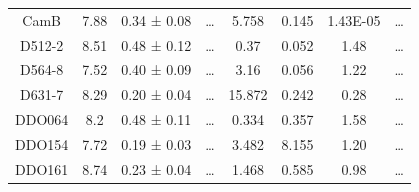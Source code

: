 \documentclass[reprint,%
 amsmath,amssymb,
 aps,
]{revtex4-1}
\begin{document}
\begin{longtable*}{|c|c|c|c|c|c|c|c| }
CamB                 & 7.88                      & 0.34 ± 0.08           & …                      & 5.758                                                        & 0.145                                                          & 1.43E-05                                                              & …                                                             \\
D512-2               & 8.51                      & 0.48 ± 0.12           & …                      & 0.37                                                         & 0.052                                                       & 1.48                                                           & …                                                             \\
D564-8               & 7.52                      & 0.40 ± 0.09           & …                      & 3.16                                                         & 0.056                                                          & 1.22                                                           & …                                                             \\
D631-7               & 8.29                      & 0.20 ± 0.04           & …                      & 15.872                                                       & 0.242                                                         & 0.28                                                           & …                                                             \\
DDO064               & 8.2                       & 0.48 ± 0.11           & …                      & 0.334                                                        & 0.357                                                         & 1.58                                                           & …                                                             \\
DDO154               & 7.72                      & 0.19 ± 0.03           & …                      & 3.482                                                        & 8.155                                                            & 1.20                                                          & …                                                             \\
DDO161               & 8.74                      & 0.23 ± 0.04           & …                      & 1.468                                                        & 0.585                                                         & 0.98                                                           & …                                                             \\

\end{longtable*}
\end{document}
